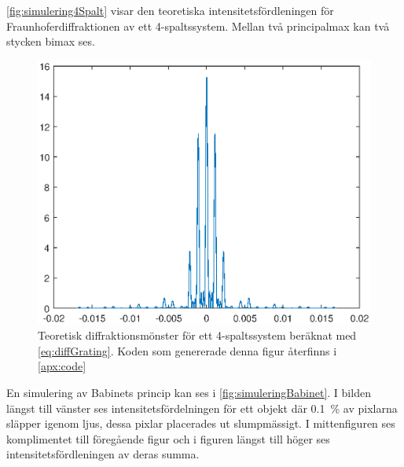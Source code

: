 \documentclass[a4paper]{article}
\begin{document}
\FloatBarrier

\autoref{fig:simulering4Spalt} visar den teoretiska intensitetsfördleningen för Fraunhoferdiffraktionen av ett 4-spaltssystem. Mellan två principalmax kan två stycken bimax ses.

\FloatBarrier

\begin{figure}[h!]
	\centering
	\includegraphics[width=0.5\linewidth]{Data/Figurer/simulering4Spalt.eps}
	\caption{Teoretisk diffraktionsmönster för ett 4-spaltssystem beräknat med \eqref{eq:diffGrating}. Koden som genererade denna figur återfinns i \autoref{apx:code}}
	\label{fig:simulering4Spalt}
\end{figure}

\FloatBarrier

En simulering av Babinets princip kan ses i \autoref{fig:simuleringBabinet}. I bilden längst till vänster ses intensitetsfördelningen för ett objekt där \SI{0.1}{\percent} av pixlarna släpper igenom ljus, dessa pixlar placerades ut slumpmässigt. I mittenfiguren ses komplimentet till föregående figur och i figuren längst till höger ses intensitetsfördleningen av deras summa.

\FloatBarrier
\end{document}
